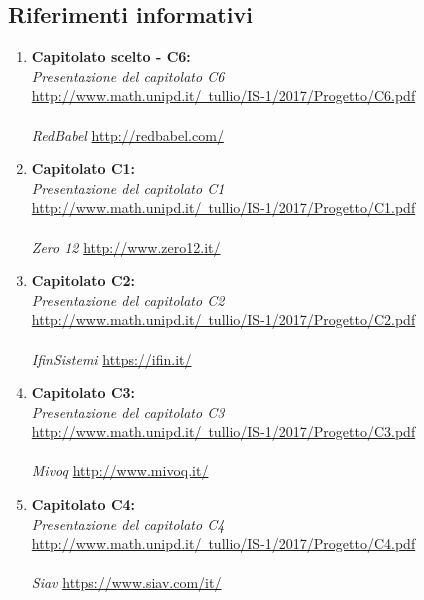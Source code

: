 \documentclass[StudioDiFattibilità.tex]{subfiles}
\begin{document}
\subsection{Riferimenti informativi}
\begin{enumerate}
	\item \textbf{Capitolato scelto - C6:}\\
		\textit{Presentazione del capitolato C6}\\
		\href{http://www.math.unipd.it/~tullio/IS-1/2017/Progetto/C6.pdf}{http://www.math.unipd.it/~tullio/IS-1/2017/Progetto/C6.pdf}\\\\
		\textit{RedBabel} \href{http://redbabel.com/}{http://redbabel.com/}
		
	\item \textbf{Capitolato C1:}\\
		\textit{Presentazione del capitolato C1}\\
		\href{http://www.math.unipd.it/~tullio/IS-1/2017/Progetto/C1.pdf}{http://www.math.unipd.it/~tullio/IS-1/2017/Progetto/C1.pdf}\\\\
		\textit{Zero 12} \href{http://www.zero12.it/}{http://www.zero12.it/}
		
	\item \textbf{Capitolato C2:}\\
		\textit{Presentazione del capitolato C2}\\
		\href{http://www.math.unipd.it/~tullio/IS-1/2017/Progetto/C2.pdf}{http://www.math.unipd.it/~tullio/IS-1/2017/Progetto/C2.pdf}\\\\
		\textit{IfinSistemi} \href{https://ifin.it/}{https://ifin.it/}
		
	\item \textbf{Capitolato C3:}\\
		\textit{Presentazione del capitolato C3}\\
		\href{http://www.math.unipd.it/~tullio/IS-1/2017/Progetto/C3.pdf}{http://www.math.unipd.it/~tullio/IS-1/2017/Progetto/C3.pdf}\\\\
		\textit{Mivoq} \href{http://www.mivoq.it/}{http://www.mivoq.it/}
		
	\item \textbf{Capitolato C4:}\\
		\textit{Presentazione del capitolato C4}\\
		\href{http://www.math.unipd.it/~tullio/IS-1/2017/Progetto/C4.pdf}{http://www.math.unipd.it/~tullio/IS-1/2017/Progetto/C4.pdf}\\\\
		\textit{Siav} \href{https://www.siav.com/it/}{https://www.siav.com/it/}
		

\end{enumerate}
\end{document}
